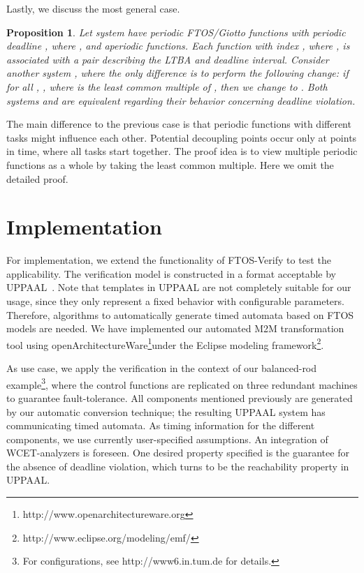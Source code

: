 \documentclass[10pt, a4paper, onecolumn, conference, compsocconf]{IEEEtran}
\newtheorem{prop}{Proposition}
\begin{document}
Lastly, we discuss the most general case.

\begin{prop}\label{more.tasks}
Let system  have  periodic FTOS/Giotto functions with periodic deadline , where , and
 aperiodic functions. Each function with index , where , is associated with a pair
  describing the LTBA and deadline interval.
 Consider another system , where the only difference is to perform the following change: if for all ,
, where  is the least common multiple of
, then we change  to . Both systems  and 
are equivalent regarding their behavior concerning deadline
violation.
\end{prop}

\begin{IEEEproof}The main difference to the previous case is that periodic functions with different tasks might influence each other. Potential decoupling points occur only at points in time, where all tasks start together. The proof idea is to view multiple periodic functions as a whole by taking the least common multiple. Here we omit the detailed proof.
\end{IEEEproof}



\section{Implementation\label{sec.Implementation}}


For implementation, we extend the functionality of FTOS-Verify to test the applicability. The verification model is constructed in a format acceptable by UPPAAL~\cite{bdl:2004:uppaal}.
Note that templates in UPPAAL are not completely suitable for our usage, since they only represent a fixed behavior with configurable
parameters. Therefore, algorithms to automatically generate timed automata based on FTOS models are needed. We have implemented our automated M2M transformation tool using openArchitectureWare\footnote{http://www.openarchitectureware.org}under the Eclipse modeling framework\footnote{http://www.eclipse.org/modeling/emf/}.

As use case, we apply the verification in the context of our balanced-rod example\footnote{For configurations, see http://www6.in.tum.de for details.}, where the control functions are replicated on three redundant machines to guarantee fault-tolerance. All components mentioned previously are generated by our automatic conversion technique; the resulting UPPAAL system has  communicating timed automata. As timing information for the different components, we use currently user-specified assumptions. An integration of WCET-analyzers is foreseen. One desired property specified is the guarantee for the absence of deadline violation, which turns to be the reachability property in UPPAAL.
\end{document}
